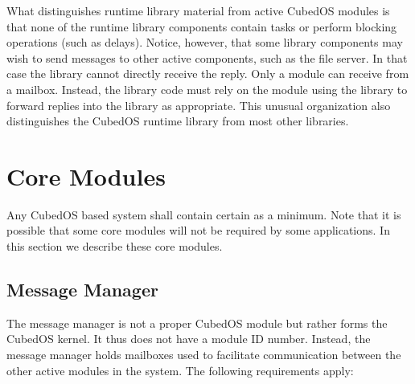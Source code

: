 What distinguishes runtime library material from active CubedOS modules is that none of the
runtime library components contain tasks or perform blocking operations (such as delays).
Notice, however, that some library components may wish to send messages to other active
components, such as the file server. In that case the library cannot directly receive the reply.
Only a module can receive from a mailbox. Instead, the library code must rely on the module
using the library to forward replies into the library as appropriate. This unusual organization
also distinguishes the CubedOS runtime library from most other libraries. 

\section{Core Modules}
\label{sec:core-modules}

Any CubedOS based system shall contain certain  as a minimum. Note that it
is possible that some core modules will not be required by some applications. In this section we
describe these core modules.

\subsection{Message Manager}
\label{sec:message-manager}

The message manager is not a proper CubedOS module but rather forms the CubedOS kernel. It thus
does not have a module ID number. Instead, the message manager holds mailboxes used to facilitate
communication between the other active modules in the system. The following requirements apply:

